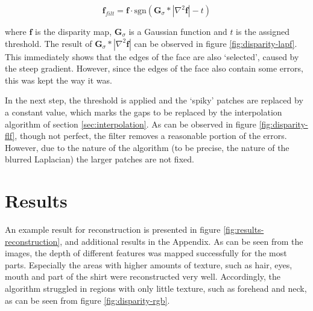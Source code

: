 \documentclass[journal]{IEEEtran}
\begin{document}
\begin{equation}
    \mathbf{f}_{filt} = \mathbf{f} \cdot \mathrm{sgn}\!\left(\mathbf{G}_\sigma * |\nabla^2\mathbf{f}| - t\right)
\end{equation}

where $ \mathbf{f} $ is the disparity map, $ \mathbf{G}_\sigma $ is a Gaussian function and $ t $ is the assigned threshold. The result of $ \mathbf{G}_\sigma * |\nabla^2\mathbf{f}| $ can be observed in figure \ref{fig:disparity-lapf}. This immediately shows that the edges of the face are also `selected', caused by the steep gradient. However, since the edges of the face also contain some errors, this was kept the way it was.

In the next step, the threshold is applied and the `spiky' patches are replaced by a constant value, which marks the gaps to be replaced by the interpolation algorithm of section \ref{sec:interpolation}. As can be observed in figure \ref{fig:disparity-flf}, though not perfect, the filter removes a reasonable portion of the errors. However, due to the nature of the algorithm (to be precise, the nature of the blurred Laplacian) the larger patches are not fixed.


\section{Results}

An example result for reconstruction is presented in figure \ref{fig:results-reconstruction}, and additional results in the Appendix.
As can be seen from the images, the depth of different features was mapped successfully for the most parts.
Especially the areas with higher amounts of texture, such as hair, eyes, mouth and part of the shirt were reconstructed very well. 
Accordingly, the algorithm struggled in regions with only little texture, such as forehead and neck, as can be seen from figure \ref{fig:disparity-rgb}.
\end{document}
